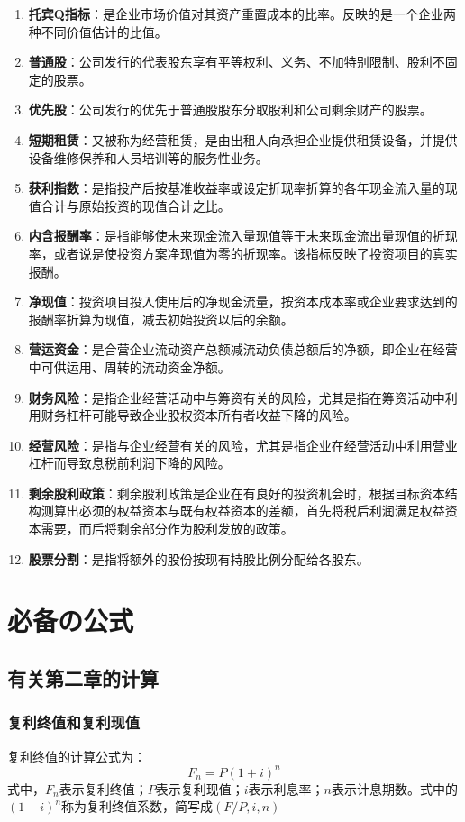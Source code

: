 \documentclass[
  10pt,
  twoside,
  openany,
  b5paper, %
  colorscheme = black, %
  xits = false,
]{qyxf-book}
\begin{document}
\begin{enumerate}
	\item \textbf{托宾Q指标}：是企业市场价值对其资产重置成本的比率。反映的是一个企业两种不同价值估计的比值。
	\item \textbf{普通股}：公司发行的代表股东享有平等权利、义务、不加特别限制、股利不固定的股票。
	\item \textbf{优先股}：公司发行的优先于普通股股东分取股利和公司剩余财产的股票。
	\item \textbf{短期租赁}：又被称为经营租赁，是由出租人向承担企业提供租赁设备，并提供设备维修保养和人员培训等的服务性业务。
	\item \textbf{获利指数}：是指投产后按基准收益率或设定折现率折算的各年现金流入量的现值合计与原始投资的现值合计之比。
	\item \textbf{内含报酬率}：是指能够使未来现金流入量现值等于未来现金流出量现值的折现率，或者说是使投资方案净现值为零的折现率。该指标反映了投资项目的真实报酬。
	\item \textbf{净现值}：投资项目投入使用后的净现金流量，按资本成本率或企业要求达到的报酬率折算为现值，减去初始投资以后的余额。
	\item \textbf{营运资金}：是合营企业流动资产总额减流动负债总额后的净额，即企业在经营中可供运用、周转的流动资金净额。
	\item \textbf{财务风险}：是指企业经营活动中与筹资有关的风险，尤其是指在筹资活动中利用财务杠杆可能导致企业股权资本所有者收益下降的风险。
	\item \textbf{经营风险}：是指与企业经营有关的风险，尤其是指企业在经营活动中利用营业杠杆而导致息税前利润下降的风险。
	\item \textbf{剩余股利政策}：剩余股利政策是企业在有良好的投资机会时，根据目标资本结构测算出必须的权益资本与既有权益资本的差额，首先将税后利润满足权益资本需要，而后将剩余部分作为股利发放的政策。
	\item \textbf{股票分割}：是指将额外的股份按现有持股比例分配给各股东。
\end{enumerate}

\chapter{必备の公式}
\section{有关第二章的计算}
\subsection{复利终值和复利现值}
复利终值的计算公式为：
\begin{equation*}
	F_n=P(1+i)^n
\end{equation*}
式中，$F_n$表示复利终值；$P$表示复利现值；$i$表示利息率；$n$表示计息期数。式中的$(1+i)^n$称为复利终值系数，简写成$(F/P,i,n)$
\end{document}
